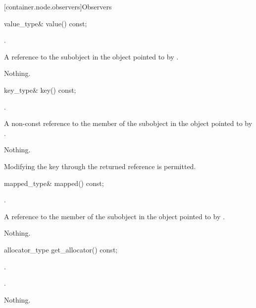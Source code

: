 [container.node.observers]{Observers}

\begin{itemdecl}
value_type& value() const;
\end{itemdecl}

\begin{itemdescr}
\pnum
\expects
{}.

\pnum
\returns
A reference to the  subobject in the
 object pointed to by .

\pnum
\throws
Nothing.
\end{itemdescr}

\begin{itemdecl}
key_type& key() const;
\end{itemdecl}

\begin{itemdescr}
\pnum
\expects
{}.

\pnum
\returns
A non-const reference to the  member of the
 subobject in the  object
pointed to by .

\pnum
\throws
Nothing.

\pnum
\remarks
Modifying the key through the returned reference is permitted.
\end{itemdescr}

\begin{itemdecl}
mapped_type& mapped() const;
\end{itemdecl}

\begin{itemdescr}
\pnum
\expects
{}.

\pnum
\returns
A reference to the  member of the
 subobject in the  object
pointed to by .

\pnum
\throws
Nothing.
\end{itemdescr}


\begin{itemdecl}
allocator_type get_allocator() const;
\end{itemdecl}

\begin{itemdescr}
\pnum
\expects
{}.

\pnum
\returns
{}.

\pnum
\throws
Nothing.
\end{itemdescr}

